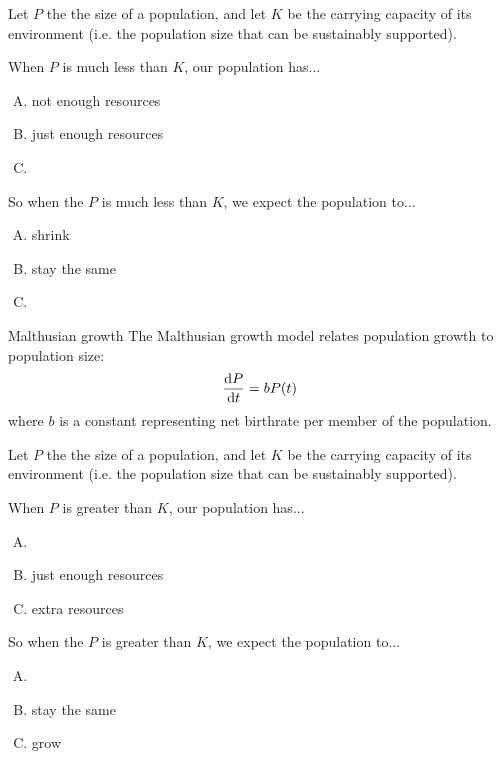 \begin{frame}[t]
Let $P$ the the size of a population, and let $K$ be the carrying capacity of its environment (i.e. the population size that can be sustainably supported).

\vfill
\begin{multicols}{2}
When $P$ is much less than $K$, our population has...
\begin{enumerate}[A.]
\item not enough resources
\item just enough resources
\item {}
\end{enumerate}
\columnbreak
So when the $P$ is much less than $K$, we expect the population to...
\begin{enumerate}[A.]
\item shrink
\item stay the same
\item {}
\end{enumerate}
\end{multicols}
\pause
\begin{block}{Malthusian growth}
The Malthusian growth model relates population growth to population size:
\[\frac{\text{d}P}{\text{d}t}=bP(t)\]
where $b$ is a constant representing net birthrate per member of the population.\end{block}
\end{frame}
\begin{frame}[t]
\AnswerSpace
{}
Let $P$ the the size of a population, and let $K$ be the carrying capacity of its environment (i.e. the population size that can be sustainably supported).


\begin{multicols}{2}
When $P$ is \alert{greater} than $K$, our population has...
\begin{enumerate}[A.]
\item {}
\item just enough resources
\item extra resources
\end{enumerate}
\columnbreak
So when the $P$ is greater than $K$, we expect the population to...
\begin{enumerate}[A.]
\item {}
\item stay the same
\item grow
\end{enumerate}
\end{multicols}
\pause

 \end{frame}
